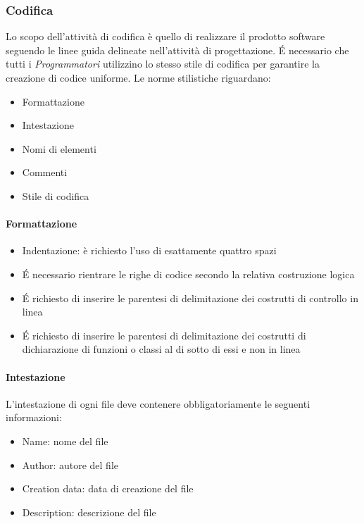 \subsubsection{Codifica}

Lo scopo dell'attività di codifica è quello di realizzare il prodotto
software seguendo le linee guida delineate nell'attività di
progettazione. 
\'E necessario che tutti i  \emph{Programmatori}  utilizzino lo stesso stile di codifica
per garantire la creazione di codice uniforme. Le norme stilistiche riguardano:
\begin{itemize}
\item Formattazione
\item Intestazione
\item Nomi di elementi
\item Commenti
\item Stile di codifica
\end{itemize}
\paragraph{Formattazione}
\begin{itemize}
\item Indentazione: è richiesto l'uso di esattamente quattro spazi
\item \'E necessario rientrare le righe di codice secondo la relativa costruzione  logica
\item \'E richiesto di inserire le parentesi di delimitazione dei costrutti di controllo in linea
\item \'E richiesto di inserire le parentesi di delimitazione dei costrutti di dichiarazione di funzioni o classi
  al di sotto di essi e non in linea

\end{itemize}

\paragraph{Intestazione}

L'intestazione di ogni file deve contenere obbligatoriamente le seguenti informazioni:
\begin{itemize}
\item Name: nome del file
\item Author: autore del file
\item Creation data: data di creazione del file
\item Description: descrizione del file
\end{itemize}

